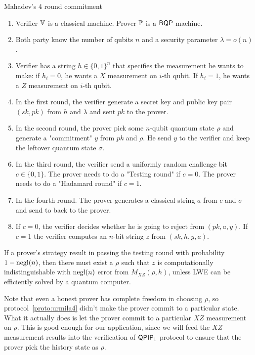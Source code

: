 \begin{protocol}{Mahadev's 4 round commitment}
\label{proto:urmila4}
\begin{enumerate}
    \item Verifier $\mathbb{V}$ is a classical machine. Prover $\mathbb{P}$ is a $\operatorname{\mathsf{BQP}}$ machine. 
    \item Both party know the number of qubits $n$ and a security parameter $\lambda=o(n)$.
    \item Verifier has a string $h \in \{0,1\}^n$ that specifies the measurement he wants to make: if $h_i=0$, he wants a $X$ measurement on $i$-th qubit. If $h_i=1$, he wants a $Z$ measurement on $i$-th qubit.  
    \item In the first round, the verifier generate a secret key and  public key pair $(sk,pk)$ from $h$ and $\lambda$ and sent $pk$ to the prover.
    \item In the second round, the prover pick some $n$-qubit quantum state $\rho$ and generate a "commitment" $y$ from $pk$ and $\rho$. He send $y$ to the verifier and keep the leftover quantum state $\sigma$.
    \item In the third round, the verifier send a uniformly random challenge bit $c\in \{0,1\}$. The prover needs to do a "Testing round" if $c=0$. The prover needs to do a "Hadamard round" if $c=1$.
    \item In the fourth round. The prover generates a classical string $a$ from $c$ and $\sigma$ and send to back to the prover.
    \item If $c=0$, the verifier decides whether he is going to reject from $(pk,a,y)$. If $c=1$ the verifier computes an $n$-bit string $z$ from $(sk,h,y,a)$.
\end{enumerate}
\end{protocol}


\begin{lemma}
If a prover's strategy result in passing the testing round with probability $1-\operatorname{negl}(n)$, then there must exist a $\rho$ such that $z$ is computationally indistinguishable with $\operatorname{negl}(n)$ error  from $M_{XZ}(\rho,h)$, unless LWE can be efficiently solved by a quantum computer. 
\end{lemma}

\begin{rmk}
Note that even a honest prover has complete freedom in choosing $\rho$, so protocol~\ref{proto:urmila4} didn't make the prover commit to a particular state. What it actually does is let the prover commit to a particular $XZ$ measurement on $\rho$. This is good enough for our application, since we will feed the $XZ$ measurement results into the verification of $\operatorname{\mathsf{QPIP}}_1$ protocol to ensure that the prover pick the history state as $\rho$.
\end{rmk}

